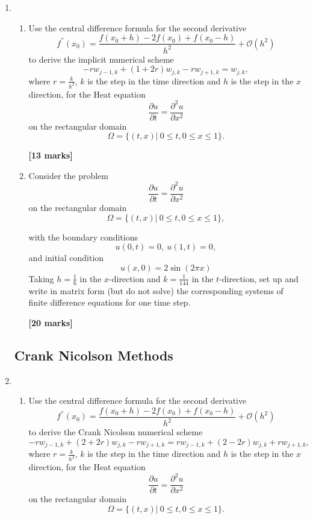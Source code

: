 \begin{enumerate}
	\item 
\begin{enumerate}
	
	\item 
	Use the central difference formula for the second derivative 
	\[ f^{''}(x_0)=\frac{f(x_0+h)-2f(x_0)+f(x_0-h)}{h^2}+\mathcal{O}(h^2)\]
	to derive the implicit numerical scheme
	\[-rw_{j-1,k}+(1+2r)w_{j,k}-rw_{j+1,k}=w_{j,k},\]
	where $r=\frac{k}{h^2}$, $k$ is the step in the time direction and $h$ is the step in the $x$ direction, 
	for the Heat equation 
	\[\frac{\partial u}{\partial t}=\frac{\partial^2 u}{\partial x^2} \]
	on the rectangular domain
		\[\Omega=\{(t,x)| \ 0\leq t, 0 \leq x \leq 1\}. \]

\begin{flushright}
\textbf{[13 marks]}
\end{flushright}
	\item Consider the problem
	\[\frac{\partial u}{\partial t}=\frac{\partial^2 u}{\partial x^2} \]
	on the rectangular domain
		\[\Omega=\{(t,x)| \ 0\leq t, 0 \leq x \leq 1\}, \]

	with the boundary conditions
	\[ u(0,t)=0, \ u(1,t)=0,   \]
	and initial condition
	\[	u(x,0)=2\sin(2\pi x) \]
		Taking $h=\frac{1}{6}$ in the $x$-direction and $k=\frac{1}{144}$ in the $t$-direction, set up and write in matrix form (but do not solve) the corresponding systems of finite difference equations for one time step.\\
\begin{flushright}
\textbf{[20 marks]}
\end{flushright}
	
	
\end{enumerate}


\subsection{Crank Nicolson Methods}

	\item 
\begin{enumerate}
	
	\item 
	Use the central difference formula for the second derivative 
	\[ f^{''}(x_0)=\frac{f(x_0+h)-2f(x_0)+f(x_0-h)}{h^2}+\mathcal{O}(h^2)\]
	to derive the Crank Nicolson numerical scheme
	\[-rw_{j-1,k}+(2+2r)w_{j,k}-rw_{j+1,k}=rw_{j-1,k}+(2-2r)w_{j,k}+rw_{j+1,k},\]
	where $r=\frac{k}{h^2}$, $k$ is the step in the time direction and $h$ is the step in the $x$ direction, 
	for the Heat equation 
	\[\frac{\partial u}{\partial t}=\frac{\partial^2 u}{\partial x^2} \]
	on the rectangular domain
		\[\Omega=\{(t,x)| \ 0\leq t, 0 \leq x \leq 1\}. \]


\end{enumerate}
\end{enumerate}
